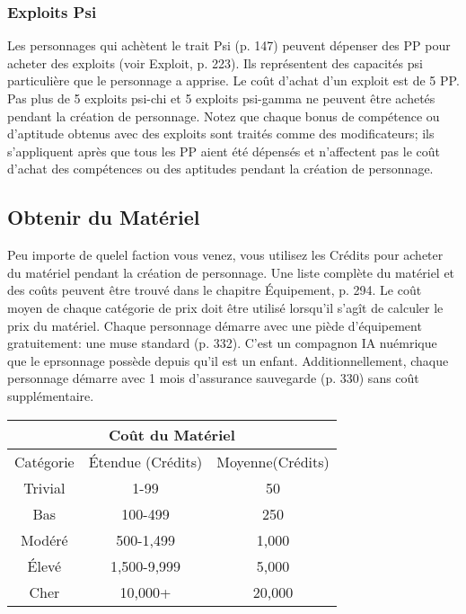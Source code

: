 \subsubsection{Exploits Psi} \label{sec:purchasing-psi-sleights} 

Les personnages qui achètent le trait Psi (p. 147) peuvent dépenser des PP pour acheter des exploits (voir Exploit, p. 223). Ils représentent des capacités psi particulière que le personnage a apprise. Le coût d'achat d'un exploit est de 5 PP. Pas plus de 5 exploits psi-chi et 5 exploits psi-gamma ne peuvent être achetés pendant la création de personnage. Notez que chaque bonus de compétence ou d'aptitude obtenus avec des exploits sont traités comme des modificateurs; ils s'appliquent après que tous les PP aient été dépensés et n'affectent pas le coût d'achat des compétences ou des aptitudes pendant la création de personnage. 

\subsection{Obtenir du Matériel} \label{sec:purchase-gear} 

Peu importe de quelel faction vous venez, vous utilisez les Crédits pour acheter du matériel pendant la création de personnage. Une liste complète du matériel et des coûts peuvent être trouvé dans le chapitre Équipement, p. 294. Le coût moyen de chaque catégorie de prix doit être utilisé lorsqu'il s'agît de calculer le prix du matériel. Chaque personnage démarre avec une piède d'équipement gratuitement: une muse standard (p. 332). C'est un compagnon IA nuémrique que le eprsonnage possède depuis qu'il est un enfant. Additionnellement, chaque personnage démarre avec 1 mois d'assurance sauvegarde (p. 330) sans coût supplémentaire. 

\begin{center} \begin{tabular}{|c|c|c|} \hline

\multicolumn{3}{|c|}{Coût du Matériel} \\ \hline

Catégorie &Étendue (Crédits) &Moyenne(Crédits)\\ \hline

Trivial &1-99 &50\\ \hline

Bas &100-499 &250\\ \hline

Modéré &500-1,499 &1,000\\ \hline

Élevé &1,500-9,999 &5,000\\ \hline

Cher &10,000+ &20,000\\ \hline \end{tabular} \end{center} 

